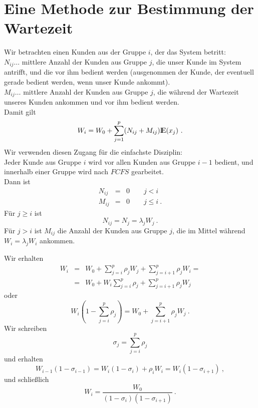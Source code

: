 \section{Eine Methode zur Bestimmung der Wartezeit}

Wir betrachten einen Kunden aus der Gruppe $i$, der das System betritt: \\
$N_{ij} \dots$ mittlere Anzahl der Kunden aus Gruppe $j$, die unser Kunde im System antrifft, und die vor ihm bedient werden (ausgenommen der Kunde, der eventuell
gerade bedient werden, wenn unser Kunde ankommt). \\
$M_{ij} \dots$ mittlere Anzahl der Kunden aus Gruppe $j$, die während der Wartezeit unseres Kunden ankommen und vor ihm bedient werden. \\
Damit gilt
\[W_{i}=W_{0}+\sum_{j=1}^{p}(N_{ij}+M_{ij}){\rm I\kern-0.2em E}(x_{j}) ~.  \]
Wir verwenden diesen Zugang für die einfachste Disziplin: \\
Jeder Kunde aus Gruppe $i$ wird vor allen Kunden aus Gruppe $i-1$ bedient, und innerhalb einer Gruppe wird nach $FCFS$ gearbeitet. \\
Dann ist
\begin{eqnarray*}
N_{ij}&=&0 \qquad j<i \\
M_{ij}&=&0 \qquad j \leq i ~.
\end{eqnarray*}
Für $j \geq i$ ist
\[N_{ij}=N_{j}=\lambda _{j}W_{j} ~. \]
Für $j>i$ ist $M_{ij}$ die Anzahl der Kunden aus Gruppe $j$, die im Mittel während $W_{i} = \lambda _{j}W_{i}$ ankommen.

Wir erhalten
\begin{eqnarray*}
W_{i}&=&W_{0}+\sum_{j=i}^{p}\rho _{j}W_{j}+\sum_{j=i+1}^{p}\rho_{j}W_{i} = \\
&=&W_{0} + W_{i}\sum_{j=i}^{p}\rho_{j} + \sum_{j=i+1}^{p}\rho_{j}W_{j}
\end{eqnarray*}
oder
\[W_{i}(1-\sum_{j=i}^{p}\rho_{j})=W_{0}+\sum_{j=i+1}^{p}\rho_{j}W_{j} ~. \]
Wir schreiben
\[\sigma_{j} = \sum_{j=i}^{p}\rho_{j}  \]
und erhalten
\[W_{i-1}(1-\sigma_{i-1})=W_{i}(1-\sigma_{i})+\rho_{i}W_{i}=W_{i}(1-\sigma_{i+1}) ~, \]
und schließlich
\[W_{i}=\frac{W_{0}}{(1-\sigma_{i})(1-\sigma_{i+1})} ~. \]

